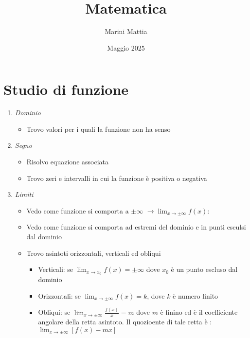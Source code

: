 
\title{Matematica}
\author{Marini Mattia}
\date{Maggio 2025}


\maketitle
{}
\tableofcontents
\newpage
\section{Studio di funzione}
\begin{enumerate}
	\item \textit{Dominio}
	      \begin{itemize}
		      \item Trovo valori per i quali la funzione non ha senso
	      \end{itemize}
	\item \textit{Segno}
	      \begin{itemize}
		      \item Risolvo equazione associata
		      \item Trovo zeri e intervalli in cui la funzione è positiva o negativa
	      \end{itemize}
	\item \textit{Limiti}
	      \begin{itemize}
		      \item Vedo come funzione si comporta a $ \pm \infty $ $ \rightarrow \lim_{x \to \pm \infty} f(x) $:
		      \item Vedo come funzione si comporta ad estremi del dominio e in punti esculsi dal dominio
		      \item Trovo asintoti orizzontali, verticali ed obliqui
		            \begin{itemize}
			            \item Verticali: se $ \lim_{x \to x_0} f(x) = \pm \infty  $ dove $ x_0 $ è un punto escluso dal dominio
			            \item Orizzontali: se $ \lim_{x \to \pm\infty} f(x) = k $, dove $ k $ è numero finito
			            \item Obliqui: se $ \lim_{x \to \pm\infty} \frac{f(x)}{x} = m $ dove $ m $ è finino ed è il coefficiente angolare della retta asintoto. Il quozioente di tale retta è : $ \lim_{x \to \pm \infty} \left[f(x) - mx\right] $
		            \end{itemize}
	      \end{itemize}

\end{enumerate}
